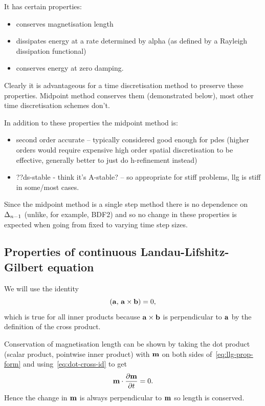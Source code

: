 It has certain properties:
\begin{itemize}
\item conserves magnetisation length
\item dissipates energy at a rate determined by alpha (as defined by a Rayleigh dissipation functional)
\item conserves energy at zero damping.
\end{itemize}

Clearly it is advantageous for a time discretisation method to preserve these properties.
Midpoint method conserves them (demonstrated below), most other time discretisation schemes don't.

In addition to these properties the midpoint method is:
\begin{itemize}
\item second order accurate -- typically considered good enough for pdes (higher orders would require expensive high order spatial discretisation to be effective, generally better to just do h-refinement instead) \cite{Matthias}
\item ??ds-stable - think it's A-stable? \cite{??ds} -- so appropriate for stiff problems, llg is stiff in some/most cases\cite{??ds}.
\end{itemize}

Since the midpoint method is a single step method there is no dependence on $\Delta_{n-1}$ (unlike, for example, BDF2) and so no change in these properties is expected when going from fixed to varying time step sizes.

\subsection{Properties of continuous Landau-Lifshitz-Gilbert equation}
\label{sec:prop-cont-llg}

We will use the identity
\begin{equation}
  \label{eq:dot-cross-id}
  \left({\mathbf{a}},\, {\mathbf{a}} \times {\mathbf{b}} \right) = 0,
\end{equation}
which is true for all inner products because ${\mathbf{a}} \times {\mathbf{b}}$ is perpendicular to ${\mathbf{a}}$ by the definition of the cross product.

Conservation of magnetisation length can be shown by taking the dot product (scalar product, pointwise inner product) with $\mathbf{m}$ on both sides of~\eqref{eq:llg-prop-form} and using~\eqref{eq:dot-cross-id} to get
\begin{equation}
  \label{eq:56}
  \mathbf{m} \cdot \frac{\partial \mathbf{m}}{\partial t} = 0.
\end{equation}
Hence the change in $\mathbf{m}$ is always perpendicular to $\mathbf{m}$ so length is conserved.

